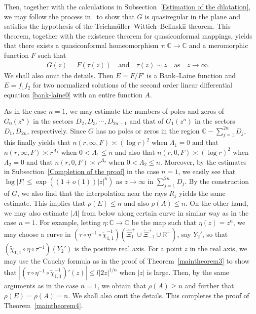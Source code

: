 \documentclass[12pt]{amsart}
\numberwithin{equation}{section}
\begin{document}
Then, together with the calculations in Subsection~\ref{Estimation of the dilatation}, we may follow the process in~\cite[Subsection~5.4]{Bergweilereremenko2017} to show that $G$ is quasiregular in the plane and satisfies the hypothesis of the Teichm\"uller--Wittich--Belinskii theorem. This theorem, together with the existence theorem for quasiconformal mappings, yields that there exists a quasiconformal homeomorphism $\tau:\mathbb{C}\to\mathbb{C}$ and a meromorphic function $F$ such that
\begin{equation*}%
\begin{split}
G(z)=F(\tau(z)) \quad  \text{and} \quad \tau(z)\sim z \quad \text{as} \quad z\to\infty.
\end{split}
\end{equation*}
We shall also omit the details. Then $E=F/F'$ is a Bank--Laine function and $E=f_1f_2$ for two normalized solutions of the second order linear differential equation \eqref{bank-laine0} with an entire function $A$.

As in the case $n=1$, we may estimate the numbers of poles and zeros of $G_0(z^n)$ in the sectors $D_2,D_3,\cdots,D_{2n-1}$ and that of $G_1(z^n)$ in the sectors $D_1,D_{2n}$, respectively. Since $G$ has no poles or zeros in the region $\mathbb{C}-\sum_{j=1}^{2n}D_j$, this finally yields that $n(r,\infty,F)\asymp (\log r)^2$ when $\Lambda_1=0$ and that $n(r,\infty,F)\asymp r^{\Lambda_1}$ when $0<\Lambda_1\leq n$ and also that $n(r,0,F)\asymp (\log r)^2$ when $\Lambda_2=0$ and that $n(r,0,F)\asymp r^{\Lambda_2}$ when $0<\Lambda_2\leq n$. Moreover, by the estimates in Subsection~\ref{Completion of the proof} in the case $n=1$, we easily see that $\log |F|\leq \exp((1+o(1))|z|^n)$ as $z\to\infty$ in $\sum_{j=1}^{2n}D_j$. By the construction of $G$, we also find that the interpolation near the rays $R_j$ yields the same estimate. This implies that $\rho(E)\leq n$ and also $\rho(A)\leq n$. On the other hand, we may also estimate $|A|$ from below along certain curve in similar way as in the case $n=1$. For example, letting $\eta:\mathbb{C}\to \mathbb{C}$ be the map such that $\eta(z)=z^n$, we may choose a curve in $(\tau\circ\eta^{-1}\circ\tilde{\chi}_{1,1}^{-1})(\hat{\Xi}_1^{+}\cup\check{\Xi}_{-1}^{+}\cup \mathbb{R}^{+})$, say $Y_2'$, so that $(\tilde{\chi}_{1,1}\circ\eta\circ\tau^{-1})(Y_2')$ is the positive real axis. For a point $z$ in the real axis, we may use the Cauchy formula as in the proof of Theorem~\ref{maintheorem3} to show that $|(\tau\circ\eta^{-1}\circ\tilde{\chi}_{1,1}^{-1})'(z)|\leq l|2z|^{1/n}$ when $|z|$ is large. Then, by the same arguments as in the case $n=1$, we obtain that $\rho(A)\geq n$ and further that $\rho(E)=\rho(A)=n$. We shall also omit the details. This completes the proof of Theorem~\ref{maintheorem4}.
\end{document}
